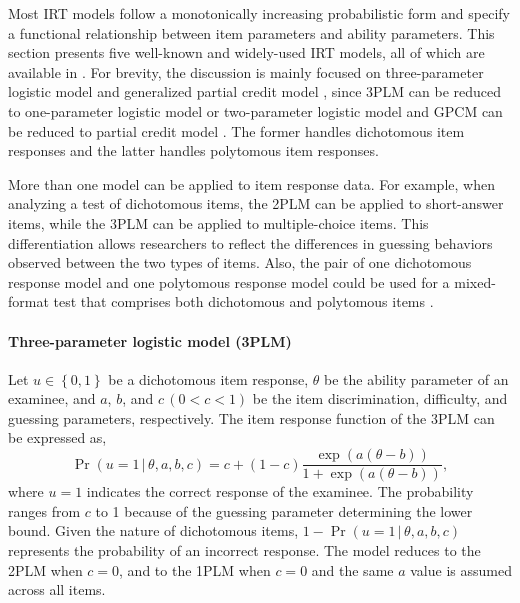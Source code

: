 Most IRT models follow a monotonically increasing probabilistic
form and specify a functional relationship between item parameters and
ability parameters. This section presents five well-known and
widely-used IRT models, all of which are available in .
For brevity, the discussion is mainly focused on three-parameter
logistic model \citep[3PLM:][]{Birnbaum:1968} and generalized partial credit
model \citep[GPCM:][]{Muraki:1992}, since 3PLM can be reduced to one-parameter
logistic model \citep[1PLM:][]{Rasch:1960} or two-parameter logistic model
\citep[2PLM:][]{Birnbaum:1968} and GPCM can be reduced to partial credit model
\citep[PCM:][]{Masters:1982}. The former handles dichotomous item
responses and the latter handles polytomous item responses.

More than one model can be applied to item response data. For
example, when analyzing a test of dichotomous items, the 2PLM can be
applied to short-answer items, while the 3PLM can be applied to
multiple-choice items. This differentiation allows researchers to
reflect the differences in guessing behaviors observed between the two
types of items. Also, the pair of one dichotomous response model and one
polytomous response model could be used for a mixed-format test that
comprises both dichotomous and polytomous items \citep{Baker+Kim:2004}.

\hypertarget{three-parameter-logistic-model-3plm}{%
\paragraph{Three-parameter logistic model (3PLM)}\label{three-parameter-logistic-model-3plm}}

Let \(u \in \left\{ 0, 1 \right\}\) be a dichotomous item response,
\(\theta\) be the ability parameter of an examinee, and \(a\), \(b\), and \(c \, (0<c<1)\) be
the item discrimination, difficulty, and guessing parameters, respectively.
The item response function of the 3PLM can be expressed as,
\begin{equation}
\Pr( u = 1 \, | \, \theta, a, b, c) = c + (1 - c)
\frac{\exp{\left(a (\theta - b) \right)}}{1 + \exp{\left(a (\theta - b) \right)}},
\label{eq:3PLM}
\end{equation}
where \(u=1\) indicates the correct response of the examinee. The
probability ranges from \(c\) to 1 because of the guessing parameter
determining the lower bound. Given the nature of dichotomous items,
\(1-\Pr( u = 1 \, | \, \theta, a, b, c)\) represents the probability of
an incorrect response. The model reduces to the 2PLM when \(c=0\), and to the
1PLM when \(c=0\) and the same \(a\) value is assumed across all items.

